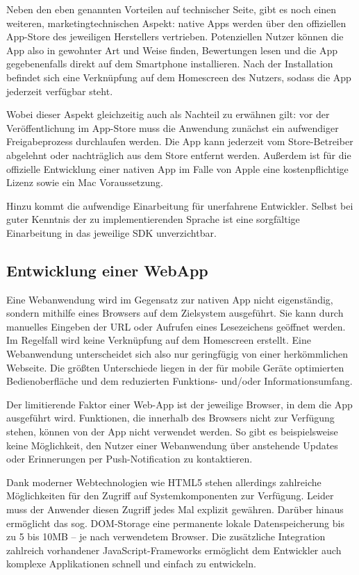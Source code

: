 Neben den eben genannten Vorteilen auf technischer Seite, gibt es noch einen weiteren, marketingtechnischen Aspekt: native Apps werden über den offiziellen App-Store des jeweiligen Herstellers vertrieben. Potenziellen Nutzer können die App also in gewohnter Art und Weise finden, Bewertungen lesen und die App gegebenenfalls direkt auf dem Smartphone installieren. Nach der Installation befindet sich eine Verknüpfung auf dem Homescreen des Nutzers, sodass die App jederzeit verfügbar steht.

Wobei dieser Aspekt gleichzeitig auch als Nachteil zu erwähnen gilt: vor der Veröffentlichung im App-Store muss die Anwendung zunächst ein aufwendiger Freigabeprozess durchlaufen werden. Die App kann jederzeit vom Store-Betreiber abgelehnt oder nachträglich aus dem Store entfernt werden. Außerdem ist für die offizielle Entwicklung einer nativen App im Falle von Apple eine kostenpflichtige Lizenz sowie ein Mac Voraussetzung.

Hinzu kommt die aufwendige Einarbeitung für unerfahrene Entwickler. Selbst bei guter Kenntnis der zu implementierenden Sprache ist eine sorgfältige Einarbeitung in das jeweilige SDK unverzichtbar. 

\subsection{Entwicklung einer WebApp}
Eine Webanwendung wird im Gegensatz zur nativen App nicht eigenständig, sondern mithilfe eines Browsers auf dem Zielsystem ausgeführt. Sie kann durch manuelles Eingeben der URL oder Aufrufen eines Lesezeichens geöffnet werden. Im Regelfall wird keine Verknüpfung auf dem Homescreen erstellt. Eine Webanwendung unterscheidet sich also nur geringfügig von einer herkömmlichen Webseite. Die größten Unterschiede liegen in der für mobile Geräte optimierten Bedienoberfläche und dem reduzierten Funktions- und/oder Informationsumfang.

Der limitierende Faktor einer Web-App ist der jeweilige Browser, in dem die App ausgeführt wird. Funktionen, die innerhalb des Browsers nicht zur Verfügung stehen, können von der App nicht verwendet werden. So gibt es beispielsweise keine Möglichkeit, den Nutzer einer Webanwendung über anstehende Updates oder Erinnerungen per Push-Notification zu kontaktieren. 

Dank moderner Webtechnologien wie HTML5 stehen allerdings zahlreiche Möglichkeiten für den Zugriff auf Systemkomponenten zur Verfügung. Leider muss der Anwender diesen Zugriff jedes Mal explizit gewähren. Darüber hinaus ermöglicht das sog. DOM-Storage eine permanente lokale Datenspeicherung bis zu 5 bis 10MB – je nach verwendetem Browser. Die zusätzliche Integration zahlreich vorhandener JavaScript-Frameworks ermöglicht dem Entwickler auch komplexe Applikationen schnell und einfach zu entwickeln.

